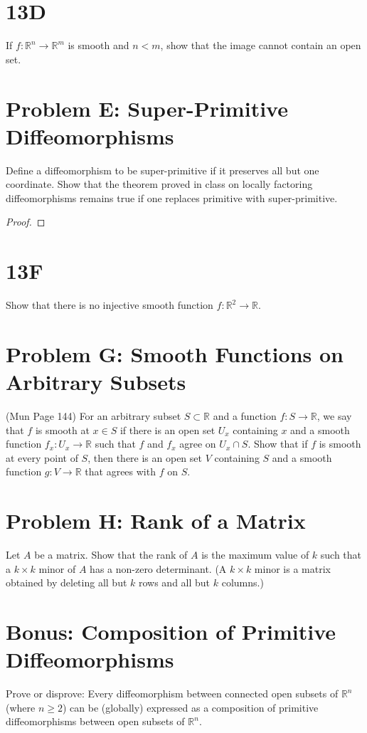 \documentclass[lang=cn,11pt]{template}
\begin{document}
\section*{13D}
If \( f : \mathbb{R}^n \to \mathbb{R}^m \) is smooth and \( n < m \), show that the image cannot contain an open set.

\section*{Problem E: Super-Primitive Diffeomorphisms}
Define a diffeomorphism to be super-primitive if it preserves all but one coordinate. Show that the theorem proved in class on locally factoring diffeomorphisms remains true if one replaces primitive with super-primitive.
\begin{proof}

    
\end{proof}


\section*{13F}
Show that there is no injective smooth function \( f : \mathbb{R}^2 \to \mathbb{R} \).

\section*{Problem G: Smooth Functions on Arbitrary Subsets}(Mun Page 144)
For an arbitrary subset \( S \subset \mathbb{R} \) and a function \( f : S \to \mathbb{R} \), we say that \( f \) is smooth at \( x \in S \) if there is an open set \( U_x \) containing \( x \) and a smooth function \( f_x : U_x \to \mathbb{R} \) such that \( f \) and \( f_x \) agree on \( U_x \cap S \). Show that if \( f \) is smooth at every point of \( S \), then there is an open set \( V \) containing \( S \) and a smooth function \( g : V \to \mathbb{R} \) that agrees with \( f \) on \( S \).

\section*{Problem H: Rank of a Matrix}
Let \( A \) be a matrix. Show that the rank of \( A \) is the maximum value of \( k \) such that a \( k \times k \) minor of \( A \) has a non-zero determinant. (A \( k \times k \) minor is a matrix obtained by deleting all but \( k \) rows and all but \( k \) columns.)

\section*{Bonus: Composition of Primitive Diffeomorphisms}
Prove or disprove: Every diffeomorphism between connected open subsets of \( \mathbb{R}^n \) (where \( n \geq 2 \)) can be (globally) expressed as a composition of primitive diffeomorphisms between open subsets of \( \mathbb{R}^n \).
\end{document}
